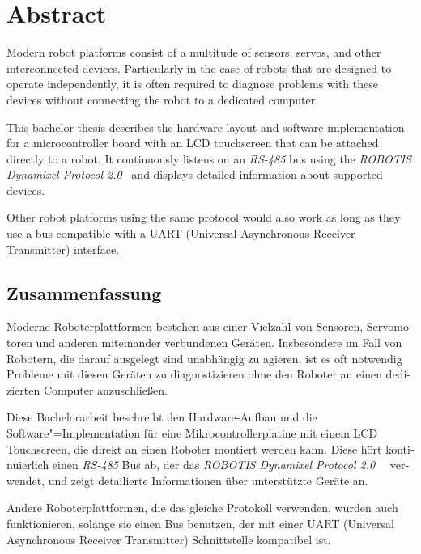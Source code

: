 \section*{Abstract}
\label{abstract}

Modern robot platforms consist of a multitude of sensors, servos, and other interconnected devices.
Particularly in the case of robots that are designed to operate independently, it is often required
to diagnose problems with these devices without connecting the robot to a dedicated computer.

This bachelor thesis describes the hardware layout and software implementation for a microcontroller
board with an LCD touchscreen that can be attached directly to a robot. It continuously listens on
an \textit{RS-485} bus using the \textit{ROBOTIS Dynamixel Protocol 2.0}~\cite{dynamixel-protocol-2}
and displays detailed information about supported devices.

Other robot platforms using the same protocol would also work as long as they use a bus compatible
with a UART (Universal Asynchronous Receiver Transmitter) interface.

\begin{otherlanguage}{ngerman}
\vfill
\section*{Zusammenfassung}
\label{zusammenfassung}

Moderne Roboterplattformen bestehen aus einer Vielzahl von Sensoren, Servomotoren und anderen
miteinander verbundenen Geräten. Insbesondere im Fall von Robotern, die darauf ausgelegt sind
unabhängig zu agieren, ist es oft notwendig Probleme mit diesen Geräten zu diagnostizieren ohne den
Roboter an einen dedizierten Computer anzuschließen.

Diese Bachelorarbeit beschreibt den Hardware-Aufbau und die Software"=Implementation für eine
Mikrocontrollerplatine mit einem LCD Touchscreen, die direkt an einen Roboter montiert werden kann.
Diese hört kontinuierlich einen \textit{RS-485} Bus ab, der das \textit{ROBOTIS Dynamixel Protocol 2.0}~\
\cite{dynamixel-protocol-2} verwendet, und zeigt detailierte Informationen über unterstützte Geräte an.

Andere Roboterplattformen, die das gleiche Protokoll verwenden, würden auch funktionieren, solange
sie einen Bus benutzen, der mit einer UART (Universal Asynchronous Receiver Transmitter) Schnittstelle
kompatibel ist.

\end{otherlanguage}
